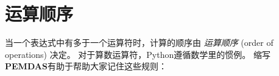 \section{运算顺序}
  


当一个表达式中有多于一个运算符时，计算的顺序由 {\em 运算顺序} (order of operations) 决定。 对于算数运算符，Python遵循数学里的惯例。 缩写\textbf{PEMDAS}有助于帮助大家记住这些规则：


